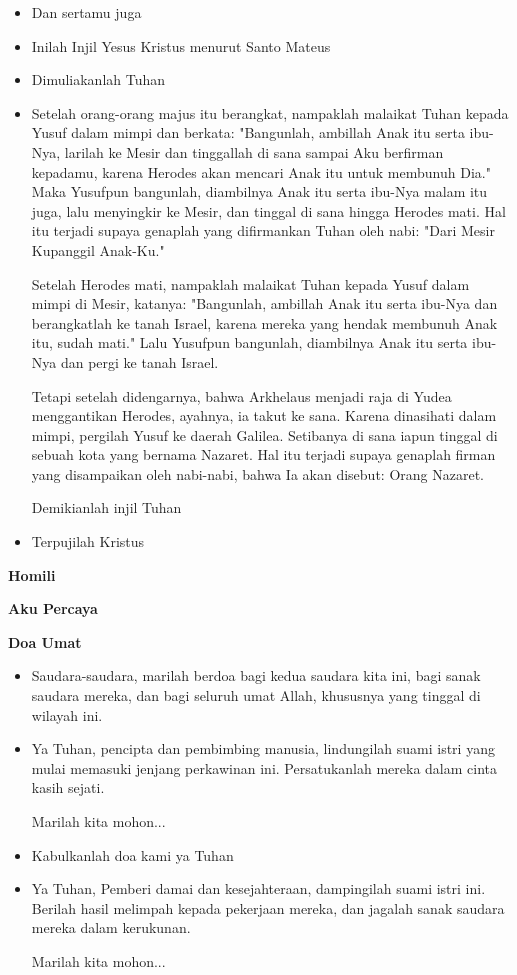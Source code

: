 \documentclass[a5paper,headsepline,titlepage,10pt]{scrbook}
\makeatletter
\newcommand{\subjudul}[1]{%
  {\parindent \z@ \normalfont
    \interlinepenalty\@M \bfseries #1\par\nobreak \vskip 20\p@ }}
\newcommand{\BU}[1]{\begin{itemize} \item[U:] #1 \end{itemize}}
\newcommand{\BI}[1]{\begin{itemize} \item[I:] #1 \end{itemize}}
\newcommand{\BP}[1]{\begin{itemize} \item[P:] #1 \end{itemize}}
\makeatother
\begin{document}
\BU{Dan sertamu juga}

\BI{Inilah Injil Yesus Kristus menurut Santo Mateus}

\BU{Dimuliakanlah Tuhan}

\BI{
Setelah orang-orang majus itu berangkat, nampaklah malaikat Tuhan kepada Yusuf dalam mimpi dan berkata: "Bangunlah, ambillah Anak itu serta ibu-Nya, larilah ke Mesir dan tinggallah di sana sampai Aku berfirman kepadamu, karena Herodes akan mencari Anak itu untuk membunuh Dia."
Maka Yusufpun bangunlah, diambilnya Anak itu serta ibu-Nya malam itu juga, lalu menyingkir ke Mesir,
dan tinggal di sana hingga Herodes mati. Hal itu terjadi supaya genaplah yang difirmankan Tuhan oleh nabi: "Dari Mesir Kupanggil Anak-Ku."

Setelah Herodes mati, nampaklah malaikat Tuhan kepada Yusuf dalam mimpi di Mesir, katanya:
"Bangunlah, ambillah Anak itu serta ibu-Nya dan berangkatlah ke tanah Israel, karena mereka yang hendak membunuh Anak itu, sudah mati."
Lalu Yusufpun bangunlah, diambilnya Anak itu serta ibu-Nya dan pergi ke tanah Israel.

Tetapi setelah didengarnya, bahwa Arkhelaus menjadi raja di Yudea menggantikan Herodes, ayahnya, ia takut ke sana. Karena dinasihati dalam mimpi, pergilah Yusuf ke daerah Galilea.
Setibanya di sana iapun tinggal di sebuah kota yang bernama Nazaret. Hal itu terjadi supaya genaplah firman yang disampaikan oleh nabi-nabi, bahwa Ia akan disebut: Orang Nazaret.

Demikianlah injil Tuhan
}

\BU{Terpujilah Kristus}

\subjudul{Homili}


\subjudul{Aku Percaya}

\subjudul{Doa Umat}

\BI{Saudara-saudara, marilah berdoa bagi kedua saudara kita ini, bagi sanak saudara mereka, dan bagi seluruh umat Allah, khususnya yang tinggal di wilayah ini.}

\BP{Ya Tuhan, pencipta dan pembimbing manusia, lindungilah suami istri yang mulai memasuki jenjang perkawinan ini. Persatukanlah mereka dalam cinta kasih sejati. 

Marilah kita mohon...}

\BU{Kabulkanlah doa kami ya Tuhan}

\BP{Ya Tuhan, Pemberi damai dan kesejahteraan, dampingilah suami istri ini. Berilah hasil melimpah kepada pekerjaan mereka, dan jagalah sanak saudara mereka dalam kerukunan. 

Marilah kita mohon...}
\end{document}
